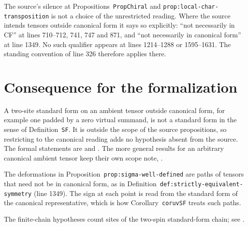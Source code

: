 \documentclass{article}
\begin{document}
The source's silence at Propositions~\texttt{PropChiral} and
\texttt{prop:local-char-transposition} is not a choice of the unrestricted
reading. Where the source intends tensors outside canonical form it says so
explicitly: ``not necessarily in CF'' at lines 710--712, 741, 747 and 871, and
``not necessarily in canonical form'' at line 1349. No such qualifier appears
at lines 1214--1288 or 1595--1631. The standing convention of line 326
therefore applies there.

\section{Consequence for the formalization}

A two-site standard form on an ambient tensor outside canonical form, for
example one padded by a zero virtual summand, is not a standard form in the
sense of Definition~\texttt{SF}. It is outside the scope of the source
propositions, so restricting to the canonical reading adds no hypothesis
absent from the source. The formal statements are
and
.
The more general results for an arbitrary canonical ambient tensor keep their
own scope note, \cite{gap:mpu_canonical_form_full_support}.

The deformations in Proposition~\texttt{prop:sigma-well-defined} are paths of
tensors that need not be in canonical form, as in
Definition~\texttt{def:strictly-equivalent-symmetry} (line 1349). The sign at
each point is read from the standard form of the canonical representative,
which is how Corollary~\texttt{coruvSF} treats such paths.

The finite-chain hypotheses count sites of the two-spin standard-form chain;
see \cite{gap:mpu_standard_form_parity_gap}.



\end{document}
